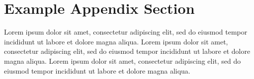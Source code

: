 \documentclass[
  journal=largetwo,
  manuscript=article-type,
  year=2020,
  volume=37,
]{cup-journal}
\begin{document}
\printendnotes



\printbibliography[prenote={preamble}]
\appendix

\section{Example Appendix Section}

Lorem ipsum dolor sit amet, consectetur adipiscing elit, sed do eiusmod tempor incididunt ut labore et dolore magna aliqua. Lorem ipsum dolor sit amet, consectetur adipiscing elit, sed do eiusmod tempor incididunt ut labore et dolore magna aliqua. Lorem ipsum dolor sit amet, consectetur adipiscing elit, sed do eiusmod tempor incididunt ut labore et dolore magna aliqua. 
\end{document}
